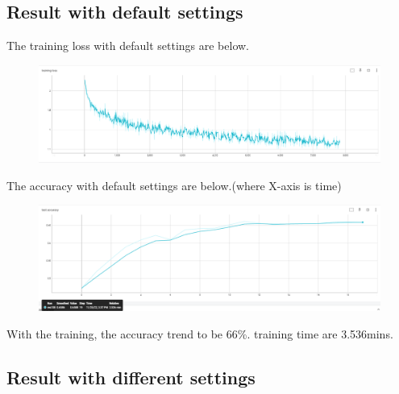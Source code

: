 \subsection{Result with default settings}
The training loss with default settings are below.
\begin{figure}[H]
    \centering
    \includegraphics[width=16cm]{Pasted image 20221127162033.png}
    \end{figure}

The accuracy with default settings are below.(where X-axis is time)
\begin{figure}[H]
    \centering
    \includegraphics[width=16cm]{Pasted image 20221127161956.png}
\end{figure}

With the training, the accuracy trend to be 66\%. training time are 3.536mins.

\subsection{Result with different settings}

